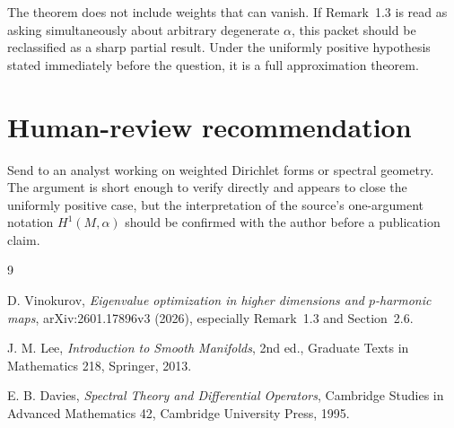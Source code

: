 \documentclass[11pt]{article}
\begin{document}
The theorem does not include weights that can vanish.  If Remark~1.3 is read
as asking simultaneously about arbitrary degenerate \(\alpha\), this packet
should be reclassified as a sharp partial result.  Under the uniformly
positive hypothesis stated immediately before the question, it is a full
approximation theorem.

\section*{Human-review recommendation}

Send to an analyst working on weighted Dirichlet forms or spectral geometry.
The argument is short enough to verify directly and appears to close the
uniformly positive case, but the interpretation of the source's one-argument
notation \(H^1(M,\alpha)\) should be confirmed with the author before a
publication claim.

\begin{thebibliography}{9}

D. Vinokurov,
\emph{Eigenvalue optimization in higher dimensions and \(p\)-harmonic maps},
arXiv:2601.17896v3 (2026), especially Remark~1.3 and
Section~2.6.

J. M. Lee,
\emph{Introduction to Smooth Manifolds}, 2nd ed.,
Graduate Texts in Mathematics 218, Springer, 2013.

E. B. Davies,
\emph{Spectral Theory and Differential Operators},
Cambridge Studies in Advanced Mathematics 42, Cambridge University Press,
1995.

\end{thebibliography}
\end{document}
